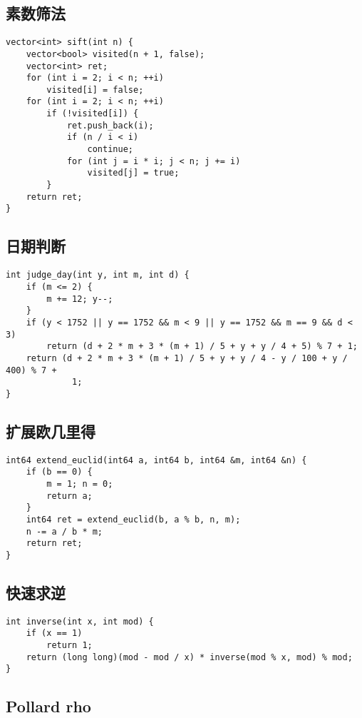 \documentclass{article}
\begin{document}
\subsection{素数筛法}

\begin{lstlisting}
vector<int> sift(int n) {
    vector<bool> visited(n + 1, false);
    vector<int> ret;
    for (int i = 2; i < n; ++i)
        visited[i] = false;
    for (int i = 2; i < n; ++i)
        if (!visited[i]) {
            ret.push_back(i);
            if (n / i < i)
                continue;
            for (int j = i * i; j < n; j += i)
                visited[j] = true;
        }
    return ret;
}
\end{lstlisting}

\subsection{日期判断}

\begin{lstlisting}
int judge_day(int y, int m, int d) {
    if (m <= 2) {
        m += 12; y--;
    }
    if (y < 1752 || y == 1752 && m < 9 || y == 1752 && m == 9 && d < 3)
        return (d + 2 * m + 3 * (m + 1) / 5 + y + y / 4 + 5) % 7 + 1;
    return (d + 2 * m + 3 * (m + 1) / 5 + y + y / 4 - y / 100 + y / 400) % 7 +
             1;
}
\end{lstlisting}

\subsection{扩展欧几里得}

\begin{lstlisting}
int64 extend_euclid(int64 a, int64 b, int64 &m, int64 &n) {
    if (b == 0) {
        m = 1; n = 0;
        return a;
    }
    int64 ret = extend_euclid(b, a % b, n, m);
    n -= a / b * m;
    return ret;
}
\end{lstlisting}

\subsection{快速求逆}

\begin{lstlisting}
int inverse(int x, int mod) {
    if (x == 1)
        return 1;
    return (long long)(mod - mod / x) * inverse(mod % x, mod) % mod;
}
\end{lstlisting}

\subsection{Pollard rho}
\end{document}

